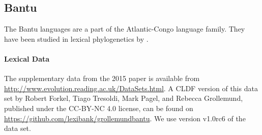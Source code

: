 \documentclass[]{rsos}%
\begin{document}
\subsection{Bantu}\label{s:bantu}
The Bantu languages are a part of the Atlantic-Congo language family. They
have been studied in lexical phylogenetics by
\textcite{grollemund2015bantu,greenhill2018population,currie2013cultural}.
\paragraph{Lexical Data}
The supplementary data from the 2015 paper \parencite{grollemund2015bantu} is available from
\url{http://www.evolution.reading.ac.uk/DataSets.html}. A CLDF version of this data set by Robert Forkel, Tiago Tresoldi, Mark Pagel, and Rebecca Grollemund, published under the CC-BY-NC 4.0 license, can be found on \url{https://github.com/lexibank/grollemundbantu}. We use version v1.0rc6 of the data set.
\end{document}
